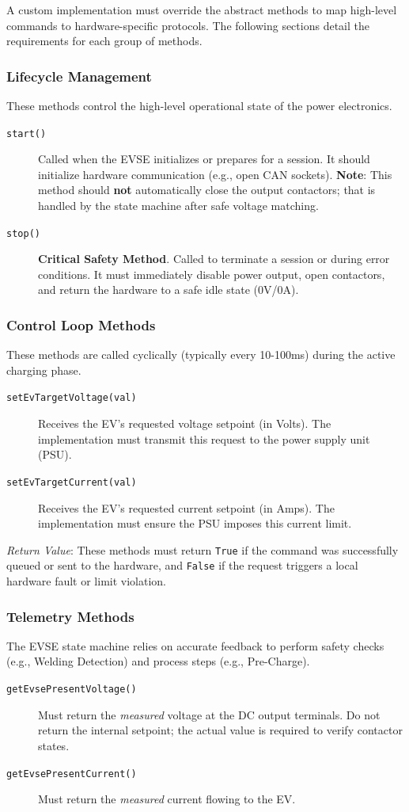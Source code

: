\documentclass[a4paper,11pt]{report}
\begin{document}
A custom implementation must override the abstract methods to map high-level commands to hardware-specific protocols. The following sections detail the requirements for each group of methods.

\subsubsection{Lifecycle Management}
These methods control the high-level operational state of the power electronics.
\begin{description}
    \item[\texttt{start()}] Called when the EVSE initializes or prepares for a session. It should initialize hardware communication (e.g., open CAN sockets). \textbf{Note}: This method should \textbf{not} automatically close the output contactors; that is handled by the state machine after safe voltage matching.
    \item[\texttt{stop()}] \textbf{Critical Safety Method}. Called to terminate a session or during error conditions. It must immediately disable power output, open contactors, and return the hardware to a safe idle state (0V/0A).
\end{description}

\subsubsection{Control Loop Methods}
These methods are called cyclically (typically every 10-100ms) during the active charging phase.
\begin{description}
    \item[\texttt{setEvTargetVoltage(val)}] Receives the EV's requested voltage setpoint (in Volts). The implementation must transmit this request to the power supply unit (PSU).
    \item[\texttt{setEvTargetCurrent(val)}] Receives the EV's requested current setpoint (in Amps). The implementation must ensure the PSU imposes this current limit.
\end{description}
\textit{Return Value}: These methods must return \texttt{True} if the command was successfully queued or sent to the hardware, and \texttt{False} if the request triggers a local hardware fault or limit violation.

\subsubsection{Telemetry Methods}
The EVSE state machine relies on accurate feedback to perform safety checks (e.g., Welding Detection) and process steps (e.g., Pre-Charge).
\begin{description}
    \item[\texttt{getEvsePresentVoltage()}] Must return the \textit{measured} voltage at the DC output terminals. Do not return the internal setpoint; the actual value is required to verify contactor states.
    \item[\texttt{getEvsePresentCurrent()}] Must return the \textit{measured} current flowing to the EV.
\end{description}
\end{document}
